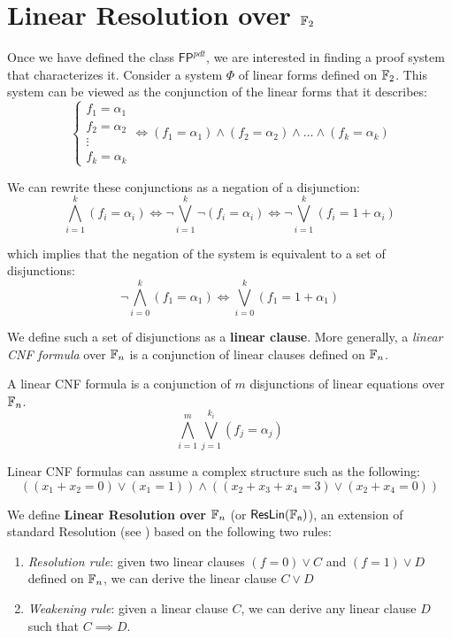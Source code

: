 \section{Linear Resolution over $\mathbb{F}_2$}

Once we have defined the class $\mathsf{FP}^{pdt}$, we are interested in finding a proof system that characterizes it. Consider a system $\Phi$ of linear forms defined on $\mathbb{F}_2$. This system can be viewed as the conjunction of the linear forms that it describes:
\[\left \{ \begin{array}{c}
 f_1 = \alpha_1 \\
 f_2 = \alpha_2 \\
    \vdots \\
 f_k = \alpha_k
\end{array}\right . \iff (f_1 = \alpha_1) \land (f_2 = \alpha_2) \land \ldots \land (f_k = \alpha_k)\]

We can rewrite these conjunctions as a negation of a disjunction:
\[\bigwedge_{i = 1}^k (f_i = \alpha_i) \iff \lnot \bigvee_{i = 1}^k \lnot (f_i = \alpha_i) \iff \lnot \bigvee_{i = 1}^k (f_i = 1 + \alpha_i)\]

which implies that the negation of the system is equivalent to a set of disjunctions:
\[\lnot \bigwedge_{i = 0}^k (f_1 = \alpha_1) \iff \bigvee_{i = 0}^k (f_1 = 1 + \alpha_1)\]

We define such a set of disjunctions as a \textbf{linear clause}. More generally, a \textit{linear CNF formula} over $\mathbb{F}_n$ is a conjunction of linear clauses defined on $\mathbb{F}_n$.

\begin{definition}
 A linear CNF formula is a conjunction of $m$ disjunctions of linear equations over $\mathbb{F}_n$.
    \[\bigwedge_{i = 1}^m \bigvee_{j = 1}^{k_i} (f_j = \alpha_j)\]
\end{definition}

Linear CNF formulas can assume a complex structure such as the following:
\[((x_1+x_2 = 0) \lor (x_1 = 1)) \land ((x_2 + x_3 + x_4 = 3) \lor (x_2 + x_4 = 0))\]

\newpage

We define \textbf{Linear Resolution over $\mathbb{F}_n$} (or $\mathsf{ResLin(\mathbb{F}_n)}$), an extension of standard Resolution (see ) based on the following two rules:
\begin{enumerate}
    \item \textit{Resolution rule}: given two linear clauses $(f = 0) \lor C$ and $(f = 1) \lor D$ defined on $\mathbb{F}_n$, we can derive the linear clause $C \lor D$
    \item \textit{Weakening rule}: given a linear clause $C$, we can derive any linear clause $D$ such that $C \implies D$.
\end{enumerate}

